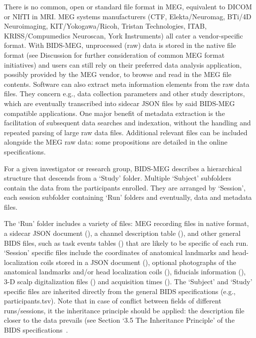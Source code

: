 There is no common, open or standard file format in MEG, equivalent to DICOM or NIfTI in MRI. MEG systems manufacturers (CTF, Elekta/Neuromag, BTi/4D Neuroimaging, KIT/Yokogawa/Ricoh, Tristan Technologies, ITAB, KRISS/Compumedics Neuroscan, York Instruments) all cater a vendor-specific format. With BIDS-MEG, unprocessed (raw) data is stored in the native file format (see Discussion for further consideration of common MEG format initiatives) and users can still rely on their preferred data analysis application, possibly provided by the MEG vendor, to browse and read in the MEG file contents. Software can also extract meta information elements from the raw data files. They concern e.g., data collection parameters and other study descriptors, which are eventually transcribed into sidecar JSON files by said BIDS-MEG compatible applications. One major benefit of metadata extraction is the facilitation of subsequent data searches and indexation, without the handling and repeated parsing of large raw data files. Additional relevant files can be included alongside the MEG raw data: some propositions are detailed in the online specifications.

For a given investigator or research group, BIDS-MEG describes a hierarchical structure that descends from a ‘Study’ folder. Multiple ‘Subject’ subfolders contain the data from the participants enrolled. They are arranged by ‘Session’, each session subfolder containing ‘Run’ folders and eventually, data and metadata files. 

The ‘Run’ folder includes a variety of files: MEG recording files in native format, a sidecar JSON document (), a channel description table (), and other general BIDS files, such as task events tables () that are likely to be specific of each run. ‘Session’ specific files include the coordinates of anatomical landmarks and head-localization coils stored in a JSON document (), optional photographs of the anatomical landmarks and/or head localization coils  (), fiducials information (), 3-D scalp digitalization files () and acquisition times (). The ‘Subject’ and ‘Study’ specific files are inherited directly from the general BIDS specifications (e.g., participants.tsv). Note that in case of conflict between fields of different runs/sessions, it the inheritance principle should be applied: the description file closer to the data prevails (see Section ‘3.5 The Inheritance Principle’ of the BIDS specifications~\citep{gorgolewski2016brain}.


